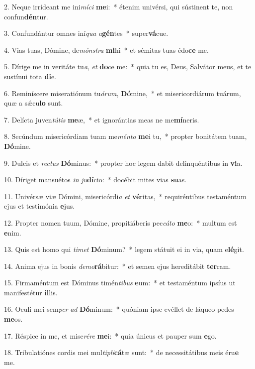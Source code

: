 2. Neque irrídeant me ini\textit{mí}\textit{ci} \textbf{me}i:~*  étenim univérsi, qui sústinent te, non confun\textbf{dén}tur.\

3. Confundántur omnes iní\textit{qua} \textit{a}\textbf{gén}tes~*  super\textbf{vá}cue.\

4. Vias tuas, Dómine, de\textit{móns}\textit{tra} \textbf{mi}hi~*  et sémitas tuas édo\textbf{ce} me.\

5. Dírige me in veritáte tu\textit{a}, \textit{et} \textbf{do}ce me:~*  quia tu es, Deus, Salvátor meus, et te sustínui tota \textbf{di}e.\

6. Reminíscere miseratiónum tu\textit{á}\textit{rum}, \textbf{Dó}mine,~*  et misericordiárum tuárum, quæ a sǽcu\textbf{lo} sunt.\

7. Delícta juven\textit{tú}\textit{tis} \textbf{me}æ,~*  et ignorántias meas ne me\textbf{mí}neris.\

8. Secúndum misericórdiam tuam me\textit{mén}\textit{to} \textbf{me}i tu,~*  propter bonitátem tuam, \textbf{Dó}mine.\

9. Dulcis et \textit{rec}\textit{tus} \textbf{Dó}minus:~*  propter hoc legem dabit delinquéntibus in \textbf{vi}a.\

10. Díriget mansuétos \textit{in} \textit{ju}\textbf{dí}cio:~*  docébit mites vias \textbf{su}as.\

11. Univérsæ viæ Dómini, misericórdi\textit{a} \textit{et} \textbf{vé}ritas,~*  requiréntibus testaméntum ejus et testimónia \textbf{e}jus.\

12. Propter nomen tuum, Dómine, propitiáberis pec\textit{cá}\textit{to} \textbf{me}o:~*  multum est \textbf{e}nim.\

13. Quis est homo qui \textit{ti}\textit{met} \textbf{Dó}minum?~*  legem státuit ei in via, quam e\textbf{lé}git.\

14. Anima ejus in bonis \textit{de}\textit{mo}\textbf{rá}bitur:~*  et semen ejus hereditábit \textbf{ter}ram.\

15. Firmaméntum est Dóminus timén\textit{ti}\textit{bus} \textbf{e}um:~*  et testaméntum ipsíus ut manifestétur \textbf{il}lis.\

16. Oculi mei sem\textit{per} \textit{ad} \textbf{Dó}minum:~*  quóniam ipse evéllet de láqueo pedes \textbf{me}os.\

17. Réspice in me, et mise\textit{ré}\textit{re} \textbf{me}i:~*  quia únicus et pauper sum \textbf{e}go.\

18. Tribulatiónes cordis mei mul\textit{ti}\textit{pli}\textbf{cá}tæ sunt:~*  de necessitátibus meis éru\textbf{e} me.\

